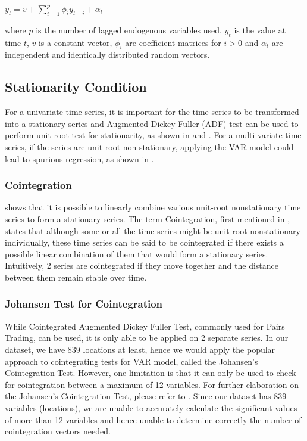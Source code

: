 \documentclass[12pt, letterpaper] {article}
\begin{document}
\begin{center}
    $\displaystyle y_t=v+\sum_{i=1}^{p} \phi_{i}y_{t-i}+\alpha_t$
\end{center}

\noindent where $p$ is the number of lagged endogenous variables used, $y_t$ is the value at time $t$, $v$ is a constant vector, $\phi_i$ are coefficient matrices for $i>0$ and $\alpha_t$ are independent and identically distributed random vectors. 

\subsection{Stationarity Condition}
For a univariate time series, it is important for the time series to be transformed into a stationary series and Augmented Dickey-Fuller (ADF) test can be used to perform unit root test for stationarity, as shown in \cite{Zhijie1998} and \cite{Rizwan2011}. For a multi-variate time series, if the series are unit-root non-stationary, applying the VAR model could lead to spurious regression, as shown in \cite{Baumohl2009}.  

\subsubsection{Cointegration}
\cite{Box1977} shows that it is possible to linearly combine various unit-root nonstationary time series to form a stationary series. The term Cointegration, first mentioned in \cite{Granger1983}, states that although some or all the time series might be unit-root nonstationary individually, these time series can be said to be cointegrated if there exists a possible linear combination of them that would form a stationary series. Intuitively, 2 series are cointegrated if they move together and the distance between them remain stable over time. 

\subsubsection{Johansen Test for Cointegration}
While Cointegrated Augmented Dickey Fuller Test, commonly used for Pairs Trading, can be used, it is only able to be applied on 2 separate series. In our dataset, we have 839 locations at least, hence we would apply the popular approach to cointegrating tests for VAR model, called the Johansen's Cointegration Test. However, one limitation is that it can only be used to check for cointegration between a maximum of 12 variables. For further elaboration on the Johansen's Cointegration Test, please refer to \cite{Johansen1991}. Since our dataset has 839 variables (locations), we are unable to accurately calculate the significant values of more than 12 variables and hence unable to determine correctly the number of cointegration vectors needed. 
\end{document}
